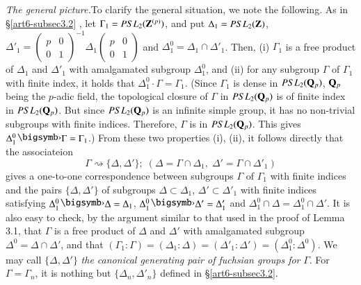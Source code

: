 \subsection{}\label{art6-subsec3.5}
\textit{The general picture.}\pageoriginale  To clarify the general situation, we note the following. As in \S \eqref{art6-subsec3.2} , let $\Gamma_1 = PSL_2 (\mathbf{Z}^{(p)})$, and put $\Delta_1 = PSL_2 (\mathbf{Z})$, $\Delta'_1 = \begin{pmatrix}
p &0\\
0&1
\end{pmatrix}^{-1} \Delta_1 
\begin{pmatrix}
p&0\\
0&1
\end{pmatrix}$ and $\Delta^0_1 = \Delta_1 \cap \Delta'_1$. Then, (i) $\Gamma_1$ is a free product of $\Delta_1$ and $\Delta'_1$ with amalgamated subgroup $\Delta^0_1$, and (ii) for any subgroup $\Gamma$ of $\Gamma_1$ with finite index, it holds that $\Delta^0_1  \cdot \Gamma = \Gamma_1$. (Since $\Gamma_1$ is dense in $PSL_2 (\mathbf{Q}_p)$, $\mathbf{Q}_p$  being the $p$-adic field, the topological closure of $\Gamma$ in $PSL_2 (\mathbf{Q}_p)$ is of finite index in $PSL_2 (\mathbf{Q}_p)$. But since $PSL_2(\mathbf{Q}_p)$ is an infinite simple group, it has no non-trivial subgroups with finite indices. Therefore, $\Gamma$ is  in $PSL_2 (\mathbf{Q}_p)$. This gives $\Delta^0_1 \bigdot \Gamma = \Gamma_1$.) From these two properties (i), (ii), it follows directly that the associateion
\begin{equation}
\Gamma \rightsquigarrow \{\Delta, \Delta'\} ; \; (\Delta = \Gamma \cap \Delta_1, \; \Delta' = \Gamma \cap \Delta'_1) 
\label{art6-eq3.5.1}
\end{equation}
gives a one-to-one correspondence between subgroups $\Gamma$ of $\Gamma_1$ with finite indices and the pairs $\{\Delta, \Delta'\}$ of subgroups $\Delta \subset \Delta_1$, \; $\Delta' \subset \Delta'_1$ with finite indices satisfying $\Delta^0_1 \bigdot \Delta = \Delta_1$, $\Delta^0_1 \bigdot \Delta' = \Delta'_1$ and $\Delta^0_1 \cap \Delta = \Delta^0_1 \cap \Delta'$. It is also easy to check, by the argument similar to that used in the proof of Lemma 3.1, that $\Gamma$ is a free product of $\Delta$ and $\Delta'$ with amalgamated subgroup $\Delta^0 = \Delta \cap \Delta'$, and that $(\Gamma_1 : \Gamma) =(\Delta_1 : \Delta) = (\Delta'_1: \Delta') = (\Delta^0_1: \Delta^0)$. We may call $\{\Delta, \Delta'\}$ \textit{the canonical generating pair of fuchsian groups for} $\Gamma$. For $\Gamma = \Gamma_n$, it is nothing but $\{\Delta_n, \Delta'_n\}$ defined in \S \ref{art6-subsec3.2}.


